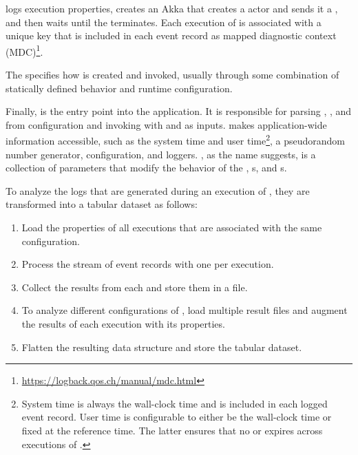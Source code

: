  logs execution properties, creates an Akka  that creates a  actor and sends it a , and then waits until the  terminates. Each execution of  is associated with a unique key that is included in each event record as mapped diagnostic context (MDC)\footnote{\url{https://logback.qos.ch/manual/mdc.html}}.

The  specifies how  is created and invoked, usually through some combination of statically defined behavior and runtime configuration.

Finally,  is the entry point into the application. It is responsible for parsing , , and  from configuration and invoking  with  and  as inputs.  makes application-wide information accessible, such as the system time and user time\footnote{System time is always the wall-clock time and is included in each logged event record. User time is configurable to either be the wall-clock time or fixed at the reference time. The latter ensures that no  or  expires across executions of .}, a pseudorandom number generator,  configuration, and loggers. , as the name suggests, is a collection of parameters that modify the behavior of the , s, and s.

To analyze the logs that are generated during an execution of , they are transformed into a tabular dataset as follows:
\begin{enumerate}
  \item Load the properties of all executions that are associated with the same configuration.
  \item Process the stream of event records with one  per execution.
  \item Collect the results from each  and store them in a file.
  \item To analyze different configurations of , load multiple result files and augment the results of each execution with its  properties.
  \item Flatten the resulting data structure and store the tabular dataset.
\end{enumerate}

